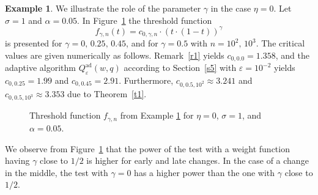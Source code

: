 \documentclass[a4paper]{amsart}
\theoremstyle{definition}
\newtheorem{exmp}     {Example}
\theoremstyle{plain}
\newcommand{\adap}{\ensuremath{ \mathrm{ad} }}
\begin{document}
\begin{exmp}\label{ex1}
We illustrate the role of the parameter $\gamma$ in the case
$\eta = 0$. Let $\sigma=1$ and $\alpha = 0.05$.
In Figure~\ref{fig:weight_function}
the threshold function
\[
f_{\gamma,n} (t) = c_{0,\gamma,n} \cdot (t \cdot (1-t))^\gamma
\]
is presented for $\gamma=0,\, 0.25,\, 0.45$, and for
$\gamma = 0.5$ with $n=10^2,\, 10^3$.
The critical values are given numerically as follows.
Remark~\ref{r1} yields
$c_{0,0.0} = 1.358$,
and the {adaptive} algorithm $Q^\adap_\varepsilon(w,q)$ according to
Section~\ref{s5} with $\varepsilon = 10^{-2}$ yields
$c_{0,0.25} = 1.99$
and
$c_{0,0.45} = 2.91$.
Furthermore,
$c_{0,0.5,10^2} \approx 3.241$ and
$c_{0,0.5,10^3} \approx 3.353$ due to Theorem~\ref{t1}.

%

\begin{figure}[htb]
	\centering
	\caption{Threshold function $f_{\gamma,n}$ from Example \ref{ex1}
		for $\eta=0$, $\sigma=1$, and $\alpha = 0.05$.}
	\label{fig:weight_function}
\end{figure}

We observe from Figure~\ref{fig:weight_function}
that the power of the test with a weight function having
$\gamma$ close to $1/2$ is higher for early and late changes.
In the case of a change in the middle, the test
with $\gamma=0$ has a higher power than the one with $\gamma$ close to
$1/2$.
\end{exmp}
\end{document}
